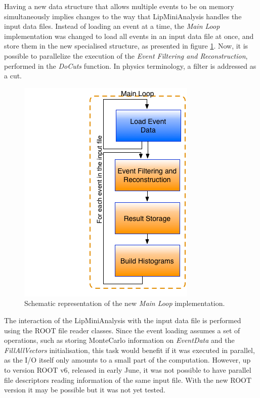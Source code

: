 Having a new data structure that allows multiple events to be on memory simultaneously implies changes to the way that LipMiniAnalysis handles the input data files. Instead of loading an event at a time, the \textit{Main Loop} implementation was changed to load all events in an input data file at once, and store them in the new specialised structure, as presented in figure \ref{fig:new_loop}. Now, it is possible to parallelize the execution of the \textit{Event Filtering and Reconstruction}, performed in the \textit{DoCuts} function. In physics terminology, a filter is addressed as a cut.

\begin{figure}[!htp]
	\begin{center}
		\includegraphics[scale=0.5]{imgs/new_loop.png}
		\caption{Schematic representation of the new \textit{Main Loop} implementation.}
		\label{fig:new_loop}
	\end{center}
\end{figure}

The interaction of the LipMiniAnalysis with the input data file is performed using the ROOT file reader classes. Since the event loading assumes a set of operations, such as storing MonteCarlo information on \textit{EventData} and the \textit{FillAllVectors} initialisation, this task would benefit if it was executed in parallel, as the I/O itself only amounts to a small part of the computation. However, up to version ROOT v6, released in early June, it was not possible to have parallel file descriptors reading information of the same input file. With the new ROOT version it may be possible but it was not yet tested.

